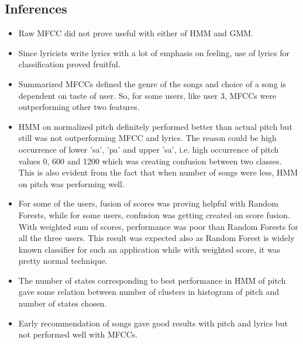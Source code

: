 \subsection{Inferences}
\begin{itemize}
\item Raw MFCC did not prove useful with either of HMM and GMM.
\item Since lyricists write lyrics with a lot of emphasis on feeling, use of lyrics for classification proved fruitful.
\item Summarized MFCCs defined the genre of the songs and choice of a song is dependent on taste of user. So, for some users, like user 3, MFCCs were outperforming other two features.
\item HMM on normalized pitch definitely performed better than actual pitch but still was not outperforming MFCC and lyrics. The reason could be high occurrence of lower 'sa', 'pa' and upper 'sa', i.e. high occurrence of pitch values 0, 600 and 1200 which was creating confusion between two classes. This is also evident from the fact that when number of songs were less, HMM on pitch was performing well.
\item For some of the users, fusion of scores was proving helpful with Random Forests, while for some users, confusion was getting created on score fusion. With weighted sum of scores, performance was poor than Random Forests for all the three users. This result was expected also as Random Forest is widely known classifier for such an application while with weighted score, it was pretty normal technique.
\item The number of states corresponding to best performance in HMM of pitch gave some relation between number of clusters in histogram of pitch and number of states chosen.
\item Early recommendation of songs gave good results with pitch and lyrics but not performed well with MFCCs.  
\end{itemize}